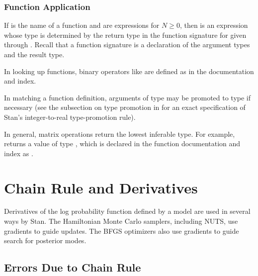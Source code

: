 \subsubsection{Function Application}

If  is the name of a function and  are
expressions for $N \geq 0$, then  is an expression
whose type is determined by the return type in the function signature
for  given  through .  Recall that a
function signature is a declaration of the argument types and the
result type.

In looking up functions, binary operators like  are
defined as  in the documentation and index.

In matching a function definition, arguments of type  may be
promoted to type  if necessary (see the subsection on type
promotion in  for an exact
specification of Stan's integer-to-real type-promotion rule).

In general, matrix operations return the lowest inferable type.  For
example,  returns a value of type
, which is declared in the function documentation and index
as .



\section{Chain Rule and Derivatives}

Derivatives of the log probability function defined by a model are
used in several ways by Stan.  The Hamiltonian Monte Carlo samplers,
including NUTS, use gradients to guide updates.  The BFGS optimizers
also use gradients to guide search for posterior modes.

\subsection{Errors Due to Chain Rule}

